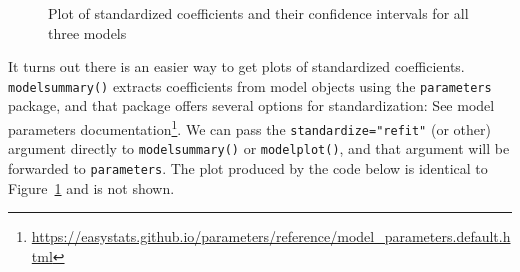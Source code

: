 \documentclass[
  letterpaper,
  10pt,
  krantz2]{krantz}
\providecommand{\href}[2]{#2\footnote{\url{#1}}}
\begin{document}
\begin{figure}[H]


\caption{\label{fig-modelplot3}Plot of standardized coefficients and
their confidence intervals for all three models}

\end{figure}%

It turns out there is an easier way to get plots of standardized
coefficients. \texttt{modelsummary()} extracts coefficients from model
objects using the \texttt{parameters} package, and that package offers
several options for standardization: See
\href{https://easystats.github.io/parameters/reference/model_parameters.default.html}{model
parameters documentation}. We can pass the \texttt{standardize="refit"}
(or other) argument directly to \texttt{modelsummary()} or
\texttt{modelplot()}, and that argument will be forwarded to
\texttt{parameters}. The plot produced by the code below is identical to
Figure~\ref{fig-modelplot3} and is not shown.
\end{document}
